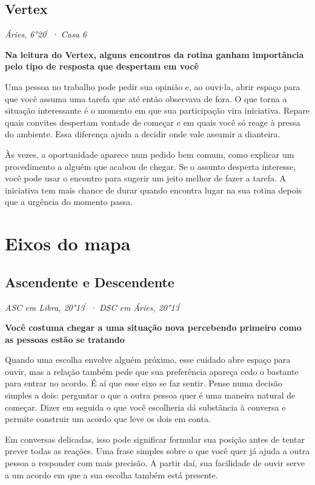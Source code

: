 \documentclass[11pt,a4paper]{article}
\newcommand{\leitura}[3]{\subsection{#1}\textit{#2}\par #3}
\newcommand{\subtituloleitura}[1]{\textbf{#1}\par\nopagebreak[4]}
\begin{document}
\leitura{Vertex}{Áries, 6°20\ensuremath{^{\prime}} · Casa 6}{
\subtituloleitura{Na leitura do Vertex, alguns encontros da rotina ganham importância pelo tipo de resposta que despertam em você} Uma pessoa no trabalho pode pedir sua opinião e, ao ouvi-la, abrir espaço para que você assuma uma tarefa que até então observava de fora. O que torna a situação interessante é o momento em que sua participação vira iniciativa. Repare quais convites despertam vontade de começar e em quais você só reage à pressa do ambiente. Essa diferença ajuda a decidir onde vale assumir a dianteira.

Às vezes, a oportunidade aparece num pedido bem comum, como explicar um procedimento a alguém que acabou de chegar. Se o assunto desperta interesse, você pode usar o encontro para sugerir um jeito melhor de fazer a tarefa. A iniciativa tem mais chance de durar quando encontra lugar na sua rotina depois que a urgência do momento passa.
}

\section{Eixos do mapa}

\leitura{Ascendente e Descendente}{ASC em Libra, 20°13\ensuremath{^{\prime}} · DSC em Áries, 20°13\ensuremath{^{\prime}}}{
\label{eixo-asc}\subtituloleitura{Você costuma chegar a uma situação nova percebendo primeiro como as pessoas estão se tratando} Quando uma escolha envolve alguém próximo, esse cuidado abre espaço para ouvir, mas a relação também pede que sua preferência apareça cedo o bastante para entrar no acordo. É aí que esse eixo se faz sentir. Pense numa decisão simples a dois: perguntar o que a outra pessoa quer é uma maneira natural de começar. Dizer em seguida o que você escolheria dá substância à conversa e permite construir um acordo que leve os dois em conta.

Em conversas delicadas, isso pode significar formular sua posição antes de tentar prever todas as reações. Uma frase simples sobre o que você quer já ajuda a outra pessoa a responder com mais precisão. A partir daí, sua facilidade de ouvir serve a um acordo em que a sua escolha também está presente.
}
\end{document}
